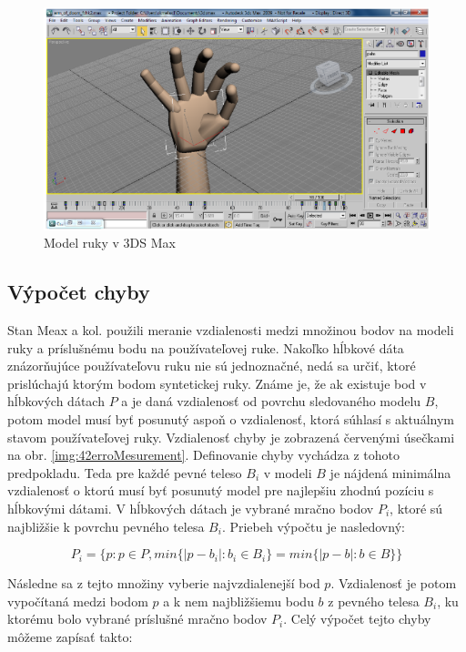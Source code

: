 \begin{figure}[H]
	\begin{center}
		\includegraphics[height=\imageHeight]{images/41handModel.png}
		\caption{Model ruky v 3DS Max}
		\label{img:41handModel}
	\end{center}
\end{figure}

\subsection{Výpočet chyby}
Stan Meax a kol. \cite{DBLP:journals/corr/MelaxKO17} použili meranie vzdialenosti medzi množinou bodov na modeli ruky a príslušnému bodu na používateľovej ruke. Nakoľko hĺbkové dáta znázorňujúce používateľovu ruku nie sú jednoznačné, nedá sa určiť, ktoré prislúchajú ktorým bodom syntetickej ruky. Známe je, že ak existuje bod v hĺbkových dátach $P$ a je daná vzdialenosť od povrchu sledovaného modelu $B$, potom model musí byť posunutý aspoň o vzdialenosť, ktorá súhlasí s aktuálnym stavom používateľovej ruky. Vzdialenosť chyby je zobrazená červenými úsečkami na obr. \ref{img:42erroMesurement}. Definovanie chyby vychádza z tohoto predpokladu. Teda pre každé pevné teleso $B_i$ v modeli $B$ je nájdená minimálna vzdialenosť o ktorú musí byť posunutý model pre najlepšiu zhodnú pozíciu s hĺbkovými dátami. V hĺbkových dátach je vybrané mračno bodov $P_i$, ktoré sú najbližšie k povrchu pevného telesa $B_i$. Priebeh výpočtu je nasledovný:

\begin{equation}\label{eqn:distance}
    P_i=\{p:p\in P, min\{|p-b_i|:b_i\in B_i\} = min\{|p-b|:b\in B\}\}
\end{equation}

Následne sa z tejto množiny vyberie najvzdialenejší bod $p$. Vzdialenosť je potom vypočítaná medzi bodom $p$ a k nem najbližšiemu bodu $b$ z pevného telesa $B_i$, ku ktorému bolo vybrané príslušné mračno bodov $P_i$. Celý výpočet tejto chyby môžeme zapísať takto:


